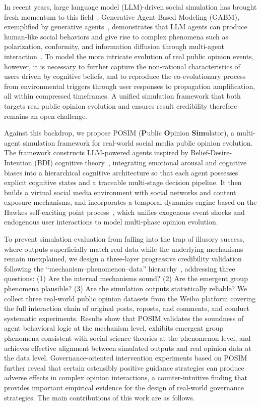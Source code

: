 \documentclass[a4paper,fleqn]{cas-dc}
\begin{document}
In recent years, large language model (LLM)-driven social simulation has brought fresh momentum to this field~\citep{wang_survey_2024}. Generative Agent-Based Modeling (GABM), exemplified by generative agents~\citep{park_generative_2023}, demonstrates that LLM agents can produce human-like social behaviors and give rise to complex phenomena such as polarization, conformity, and information diffusion through multi-agent interaction~\citep{gao_s3_2023,chuang_simulating_2024}. To model the more intricate evolution of real public opinion events, however, it is necessary to further capture the non-rational characteristics of users driven by cognitive beliefs, and to reproduce the co-evolutionary process from environmental triggers through user responses to propagation amplification, all within compressed timeframes. A unified simulation framework that both targets real public opinion evolution and ensures result credibility therefore remains an open challenge.

Against this backdrop, we propose POSIM (\textbf{P}ublic \textbf{O}pinion \textbf{Sim}ulator), a multi-agent simulation framework for real-world social media public opinion evolution. The framework constructs LLM-powered agents inspired by Belief-Desire-Intention (BDI) cognitive theory~\citep{bratman_intention_1987,rao_bdi_1995}, integrating emotional arousal and cognitive biases into a hierarchical cognitive architecture so that each agent possesses explicit cognitive states and a traceable multi-stage decision pipeline. It then builds a virtual social media environment with social networks and content exposure mechanisms, and incorporates a temporal dynamics engine based on the Hawkes self-exciting point process~\citep{hawkes_spectra_1971}, which unifies exogenous event shocks and endogenous user interactions to model multi-phase opinion evolution.

To prevent simulation evaluation from falling into the trap of illusory success, where outputs superficially match real data while the underlying mechanisms remain unexplained, we design a three-layer progressive credibility validation following the ``mechanism--phenomenon--data'' hierarchy~\citep{sargent_verification_2013}, addressing three questions: (1) Are the internal mechanisms sound? (2) Are the emergent group phenomena plausible? (3) Are the simulation outputs statistically reliable? We collect three real-world public opinion datasets from the Weibo platform covering the full interaction chain of original posts, reposts, and comments, and conduct systematic experiments. Results show that POSIM validates the soundness of agent behavioral logic at the mechanism level, exhibits emergent group phenomena consistent with social science theories at the phenomenon level, and achieves effective alignment between simulated outputs and real opinion data at the data level. Governance-oriented intervention experiments based on POSIM further reveal that certain ostensibly positive guidance strategies can produce adverse effects in complex opinion interactions, a counter-intuitive finding that provides important empirical evidence for the design of real-world governance strategies. The main contributions of this work are as follows.
\end{document}
